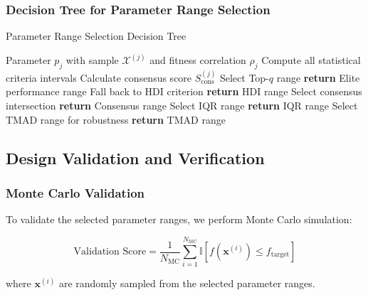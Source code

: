 \documentclass[12pt,a4paper]{article}
\begin{document}
\subsubsection{Decision Tree for Parameter Range Selection}

\begin{algorithm}[H]
\caption{Parameter Range Selection Decision Tree}
\begin{algorithmic}[1]
\REQUIRE Parameter $p_j$ with sample $\mathcal{X}^{(j)}$ and fitness correlation $\rho_j$
\STATE Compute all statistical criteria intervals
\STATE Calculate consensus score $S_{\text{cons}}^{(j)}$
        \STATE Select Top-$q$ range
        \STATE \textbf{return} Elite performance range
    \ELSE
        \STATE Fall back to HDI criterion
        \STATE \textbf{return} HDI range
    \ENDIF
{}
    \STATE Select consensus intersection
    \STATE \textbf{return} Consensus range
    \STATE Select IQR range
    \STATE \textbf{return} IQR range
\ELSE
    \STATE Select TMAD range for robustness
    \STATE \textbf{return} TMAD range
\ENDIF
\end{algorithmic}
\end{algorithm}

\subsection{Design Validation and Verification}

\subsubsection{Monte Carlo Validation}

To validate the selected parameter ranges, we perform Monte Carlo simulation:

\begin{equation}
\text{Validation Score} = \frac{1}{N_{\text{MC}}} \sum_{i=1}^{N_{\text{MC}}} \mathbb{I}[f(\mathbf{x}^{(i)}) \leq f_{\text{target}}]
\end{equation}

where $\mathbf{x}^{(i)}$ are randomly sampled from the selected parameter ranges.
\end{document}
